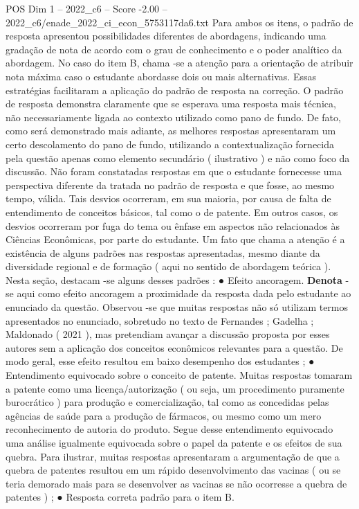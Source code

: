 \begin{textsample}{POS Dim 1 – 2022\_c6 – Score -2.00 – 2022\_c6/enade\_2022\_ci\_econ\_5753117da6.txt}
Para ambos os itens, o padrão de resposta apresentou possibilidades diferentes de abordagens, indicando uma gradação de nota de acordo com o grau de conhecimento e o poder analítico da abordagem.
No caso do item B, chama -se a atenção para a orientação de atribuir nota máxima caso o estudante abordasse dois ou mais alternativas.
Essas estratégias facilitaram a aplicação do padrão de resposta na correção.
O padrão de resposta demonstra claramente que se esperava uma resposta mais técnica, não necessariamente ligada ao contexto utilizado como pano de fundo.
De fato, como será demonstrado mais adiante, as melhores respostas apresentaram um certo descolamento do pano de fundo, utilizando a contextualização fornecida pela questão apenas como elemento secundário ( ilustrativo ) e não como foco da discussão.
Não foram constatadas respostas em que o estudante fornecesse uma perspectiva diferente da tratada no padrão de resposta e que fosse, ao mesmo tempo, válida.
Tais desvios ocorreram, em sua maioria, por causa de falta de entendimento de conceitos básicos, tal como o de patente.
Em outros casos, os desvios ocorreram por fuga do tema ou ênfase em aspectos não relacionados às Ciências Econômicas, por parte do estudante.
Um fato que chama a atenção é a existência de alguns padrões nas respostas apresentadas, mesmo diante da diversidade regional e de formação ( aqui no sentido de abordagem teórica ).
Nesta seção, destacam -se alguns desses padrões : {\EmojiFont ●} Efeito ancoragem. \textbf{Denota} -se aqui como efeito ancoragem a proximidade da resposta dada pelo estudante ao enunciado da questão.
Observou -se que muitas respostas não só utilizam termos apresentados no enunciado, sobretudo no texto de Fernandes ; Gadelha ; Maldonado ( 2021 ), mas pretendiam avançar a discussão proposta por esses autores sem a aplicação dos conceitos econômicos relevantes para a questão.
De modo geral, esse efeito resultou em baixo desempenho dos estudantes ; {\EmojiFont ●} Entendimento equivocado sobre o conceito de patente.
Muitas respostas tomaram a patente como uma licença/autorização ( ou seja, um procedimento puramente burocrático ) para produção e comercialização, tal como as concedidas pelas agências de saúde para a produção de fármacos, ou mesmo como um mero reconhecimento de autoria do produto.
Segue desse entendimento equivocado uma análise igualmente equivocada sobre o papel da patente e os efeitos de sua quebra.
Para ilustrar, muitas respostas apresentaram a argumentação de que a quebra de patentes resultou em um rápido desenvolvimento das vacinas ( ou se teria demorado mais para se desenvolver as vacinas se não ocorresse a quebra de patentes ) ; {\EmojiFont ●} Resposta correta padrão para o item B.

\end{textsample}
